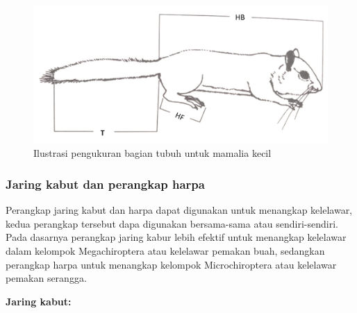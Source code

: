 \documentclass[
  oneside]{book}
\begin{document}
\begin{figure}

{\centering \includegraphics[width=1\linewidth]{images/mfm_ilustration} 

}

\caption{Ilustrasi pengukuran bagian tubuh untuk mamalia kecil}\label{fig:mfsm}
\end{figure}

\hypertarget{jaring-kabut-dan-perangkap-harpa}{%
\subsubsection*{Jaring kabut dan perangkap harpa}\label{jaring-kabut-dan-perangkap-harpa}}

Perangkap jaring kabut dan harpa dapat digunakan untuk menangkap kelelawar, kedua perangkap tersebut dapa digunakan bersama-sama atau sendiri-sendiri. Pada dasarnya perangkap jaring kabur lebih efektif untuk menangkap kelelawar dalam kelompok Megachiroptera atau kelelawar pemakan buah, sedangkan perangkap harpa untuk menangkap kelompok Microchiroptera atau kelelawar pemakan serangga.

\textbf{Jaring kabut:}
\end{document}
